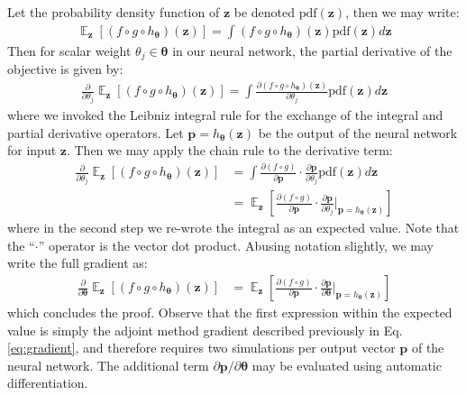 \documentclass{article}
\DeclareMathOperator*{\EX}{\mathbb{E}}%
\begin{document}
Let the probability density function of $\mathbf{z}$ be denoted $\text{pdf}(\mathbf{z})$, then we may write:
\begin{align}
    \EX_{\mathbf{z}} [(f\circ g \circ h_{\boldsymbol{\theta}})(\mathbf{z})] = \int (f\circ g \circ h_{\boldsymbol{\theta}})(\mathbf{z}) \text{pdf}(\mathbf{z})d\mathbf{z}
\end{align}
Then for scalar weight $\theta_j\in\boldsymbol{\theta}$ in our neural network, the partial derivative of the objective is given by:
\begin{align}
    \frac{\partial}{\partial \theta_j}\EX_{\mathbf{z}} [(f\circ g \circ h_{\boldsymbol{\theta}})(\mathbf{z})] = \int \frac{\partial (f\circ g \circ h_{\boldsymbol{\theta}})(\mathbf{z})}{\partial \theta_j} \text{pdf}(\mathbf{z})d\mathbf{z}
\end{align}
where we invoked the Leibniz integral rule for the exchange of the integral and partial derivative operators. Let $\mathbf{p}=h_{\boldsymbol{\theta}}(\mathbf{z})$ be the output of the neural network for input $\mathbf{z}$. Then we may apply the chain rule to the derivative term:
\begin{align}
    \frac{\partial}{\partial \theta_j}\EX_{\mathbf{z}} [(f\circ g \circ h_{\boldsymbol{\theta}})(\mathbf{z})] &= \int \frac{\partial (f\circ g)}{\partial \mathbf{p}}\cdot\frac{\partial \mathbf{p}}{\partial \theta_j} \text{pdf}(\mathbf{z})d\mathbf{z} \\
    &= \EX_\mathbf{z}\left[\frac{\partial (f\circ g)}{\partial \mathbf{p}}\cdot\frac{\partial \mathbf{p}}{\partial \theta_j} \bigg|_{\mathbf{p}=h_{\boldsymbol{\theta}}(\mathbf{z})}\right]
\end{align}
where in the second step we re-wrote the integral as an expected value. Note that the ``$\cdot$'' operator is the vector dot product. Abusing notation slightly, we may write the full gradient as:
\begin{align}
   \frac{\partial}{\partial \boldsymbol{\theta}}\EX_{\mathbf{z}} [(f\circ g \circ h_{\boldsymbol{\theta}})(\mathbf{z})]&= \EX_\mathbf{z}\left[\frac{\partial (f\circ g)}{\partial \mathbf{p}}\cdot\frac{\partial \mathbf{p}}{\partial \boldsymbol{\theta}} \bigg|_{\mathbf{p}=h_{\boldsymbol{\theta}}(\mathbf{z})}\right]\label{eq:glonet_deriv}
\end{align}
which concludes the proof. Observe that the first expression within the expected value is simply the adjoint method gradient described previously in Eq.\,\eqref{eq:gradient}, and therefore requires two simulations per output vector $\mathbf{p}$ of the neural network. The additional term $\partial \mathbf{p}/\partial \boldsymbol{\theta}$ may be evaluated using automatic differentiation.  
\end{document}
